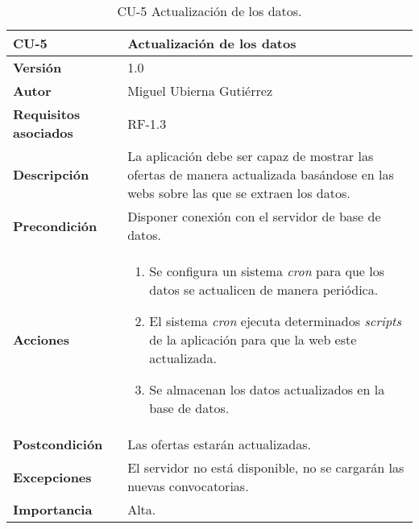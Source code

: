 \begin{table}[p]
	\centering
	\begin{tabularx}{\linewidth}{ p{} p{} }
		\toprule
		\textbf{CU-5}    & \textbf{Actualización de los datos}\\
		\toprule
		\textbf{Versión}              & 1.0    \\
		\textbf{Autor}                & Miguel Ubierna Gutiérrez \\
		\textbf{Requisitos asociados} & RF-1.3 \\
		\textbf{Descripción}          & La aplicación debe ser capaz de mostrar las ofertas de manera actualizada basándose en las webs sobre las que se extraen los datos. \\
		\textbf{Precondición}         & Disponer conexión con el servidor de base de datos.\\
		\textbf{Acciones}             &
		\begin{enumerate}
			\def\labelenumi{\arabic{enumi}.}
			\tightlist
			\item Se configura un sistema \textit{cron} para que los datos se actualicen de manera periódica.
			\item El sistema \textit{cron} ejecuta determinados \textit{scripts} de la aplicación para que la web este actualizada.
                \item Se almacenan los datos actualizados en la base de datos.
		\end{enumerate}\\
		\textbf{Postcondición}        & Las ofertas estarán actualizadas. \\
		\textbf{Excepciones}          & El servidor no está disponible, no se cargarán las nuevas convocatorias.  \\
		\textbf{Importancia}          & Alta.  \\
		\bottomrule
	\end{tabularx}
	\caption{CU-5 Actualización de los datos.}
\end{table}


